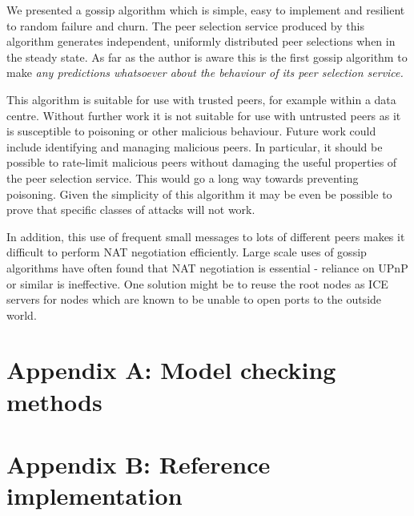 \documentclass[a4paper,10pt]{article}
\begin{document}
We presented a gossip algorithm which is simple, easy to implement and resilient to random failure and churn. The peer selection service produced by this algorithm generates independent, uniformly distributed peer selections when in the steady state. As far as the author is aware this is the first gossip algorithm to make \em{any} predictions whatsoever about the behaviour of its peer selection service.

This algorithm is suitable for use with trusted peers, for example within a data centre. Without further work it is not suitable for use with untrusted peers as it is susceptible to poisoning or other malicious behaviour. Future work could include identifying and managing malicious peers. In particular, it should be possible to rate-limit malicious peers without damaging the useful properties of the peer selection service. This would go a long way towards preventing poisoning. Given the simplicity of this algorithm it may be even be possible to prove that specific classes of attacks will not work.

In addition, this use of frequent small messages to lots of different peers makes it difficult to perform NAT negotiation efficiently. Large scale uses of gossip algorithms have often found that NAT negotiation is essential - reliance on UPnP or similar is ineffective. One solution might be to reuse the root nodes as ICE servers for nodes which are known to be unable to open ports to the outside world.

\nocite{*}




\section{Appendix A: Model checking methods}

\section{Appendix B: Reference implementation}
\end{document}
